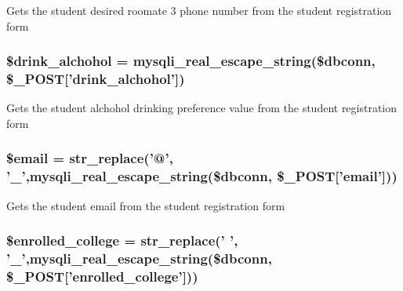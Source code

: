 \-Gets the student desired roomate 3 phone number from the student registration form \hypertarget{user__view_2validate_2studentVal_8php_a155e4a24650f8440d97423fe1d652eb7}{
\subsubsection[{\$drink\-\_\-alchohol}]{\setlength{\rightskip}{0pt plus 5cm}\$drink\-\_\-alchohol = mysqli\-\_\-real\-\_\-escape\-\_\-string(\$dbconn, \$\-\_\-\-P\-O\-S\-T\mbox{[}'drink\-\_\-alchohol'\mbox{]})}}\label{user__view_2validate_2studentVal_8php_a155e4a24650f8440d97423fe1d652eb7}
\-Gets the student alchohol drinking preference value from the student registration form \hypertarget{user__view_2validate_2studentVal_8php_ad634f418b20382e2802f80532d76d3cd}{
\subsubsection[{\$email}]{\setlength{\rightskip}{0pt plus 5cm}\$email = str\-\_\-replace('@', '\-\_\-',mysqli\-\_\-real\-\_\-escape\-\_\-string(\$dbconn, \$\-\_\-\-P\-O\-S\-T\mbox{[}'email'\mbox{]}))}}\label{user__view_2validate_2studentVal_8php_ad634f418b20382e2802f80532d76d3cd}
\-Gets the student email from the student registration form \hypertarget{user__view_2validate_2studentVal_8php_a4918f9ca4d470ccadff836850844ea58}{
\subsubsection[{\$enrolled\-\_\-college}]{\setlength{\rightskip}{0pt plus 5cm}\$enrolled\-\_\-college = str\-\_\-replace(' ', '\-\_\-',mysqli\-\_\-real\-\_\-escape\-\_\-string(\$dbconn, \$\-\_\-\-P\-O\-S\-T\mbox{[}'enrolled\-\_\-college'\mbox{]}))}}\label{user__view_2validate_2studentVal_8php_a4918f9ca4d470ccadff836850844ea58}
